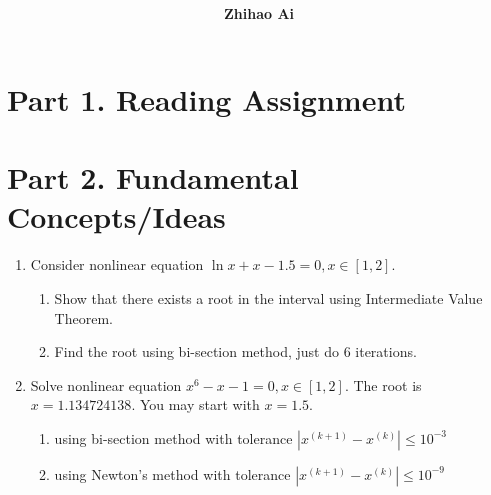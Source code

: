 \documentclass[10pt]{report}
\title{
	\vspace{2in}
	\textmd{\textbf{\hwCourse\\\hwTitle}}\\
	\vspace{0.3in}\large{\textit{\hmwkClassInstructor}}
	\vspace{3in}
}
\author{\textbf{Zhihao Ai}}
\date{}
\newcommand{\abs}[1] {\left| #1 \right|}
\begin{document}
\maketitle

\section*{Part 1. Reading Assignment}

\section*{Part 2. Fundamental Concepts/Ideas}
\begin{enumerate}
	\item 
	Consider nonlinear equation $\ln x + x - 1.5 = 0, x\in [1,2]$.
	\begin{enumerate}
		\item 
		Show that there exists a root in the interval using Intermediate Value Theorem.
		
		\item 
		Find the root using bi-section method, just do 6 iterations.
	\end{enumerate}

	\item 
	Solve nonlinear equation $x^6 - x - 1 = 0, x\in [1,2]$. The root is $x=1.134724138$. You may start with $x=1.5$.
	\begin{enumerate}
		\item 
		using bi-section method with tolerance $\abs{x^{(k+1)} - x^{(k)}} \le 10^{-3}$

		\item 
		using Newton's method with tolerance $\abs{x^{(k+1)} - x^{(k)}} \le 10^{-9}$
	\end{enumerate}
\end{enumerate}
\end{document}
